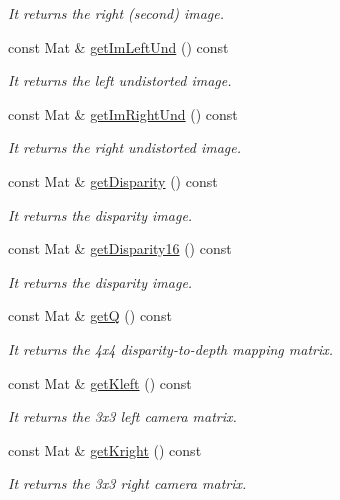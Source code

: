 \begin{DoxyCompactItemize}
\begin{DoxyCompactList}\small\item\em It returns the right (second) image. \end{DoxyCompactList}\item 
const Mat \& \hyperlink{classStereoCamera_a52ba4f0331f3690ca0f983b10bd0c783}{get\+Im\+Left\+Und} () const
\begin{DoxyCompactList}\small\item\em It returns the left undistorted image. \end{DoxyCompactList}\item 
const Mat \& \hyperlink{classStereoCamera_a19009c20003a5c7e957a4b3c34913fe9}{get\+Im\+Right\+Und} () const
\begin{DoxyCompactList}\small\item\em It returns the right undistorted image. \end{DoxyCompactList}\item 
const Mat \& \hyperlink{classStereoCamera_a74adec3c305b13df4757e105cd72a7db}{get\+Disparity} () const
\begin{DoxyCompactList}\small\item\em It returns the disparity image. \end{DoxyCompactList}\item 
const Mat \& \hyperlink{classStereoCamera_a4a6e408446750224499ed9ecdc51629e}{get\+Disparity16} () const
\begin{DoxyCompactList}\small\item\em It returns the disparity image. \end{DoxyCompactList}\item 
const Mat \& \hyperlink{classStereoCamera_a9f10e66261a0211e5d786abc3df8a70b}{getQ} () const
\begin{DoxyCompactList}\small\item\em It returns the 4x4 disparity-\/to-\/depth mapping matrix. \end{DoxyCompactList}\item 
const Mat \& \hyperlink{classStereoCamera_a932e0ebd63c3e9a93b33c1846459aadc}{get\+Kleft} () const
\begin{DoxyCompactList}\small\item\em It returns the 3x3 left camera matrix. \end{DoxyCompactList}\item 
const Mat \& \hyperlink{classStereoCamera_a6f9e53e949b77cd19e28a4ec92034a3d}{get\+Kright} () const
\begin{DoxyCompactList}\small\item\em It returns the 3x3 right camera matrix. \end{DoxyCompactList}\item 

\end{DoxyCompactItemize}
